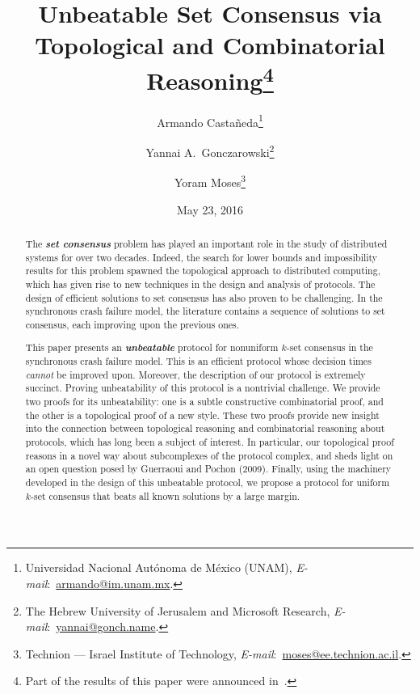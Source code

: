 \documentclass[11pt]{article}
\theoremstyle{definition}
\newcommand{\defemph}[1]{\textbf{\textit{#1}}}
\begin{document}
\title{Unbeatable Set Consensus via \\ Topological and Combinatorial Reasoning\thanks{
Part of the results of this paper
were announced
in~\cite{AYY-PODC-BA}.
}}

\author{Armando Casta\~{n}eda\thanks{Universidad Nacional Aut\'onoma de M\'exico (UNAM), \mbox{\emph{E-mail}: \href{mailto:armando@im.unam.mx}{armando@im.unam.mx}}.}
\and Yannai A.~Gonczarowski\thanks{The Hebrew University of Jerusalem and Microsoft Research, \mbox{\emph{E-mail}: \href{mailto:yannai@gonch.name}{yannai@gonch.name}}.}
\and Yoram Moses\thanks{Technion --- Israel Institute of Technology, \mbox{\emph{E-mail}: \href{mailto:moses@ee.technion.ac.il}{moses@ee.technion.ac.il}}.}}

\date{May 23, 2016}

\maketitle
\begin{abstract}
The \defemph{set consensus} problem has played an important role in the study of distributed systems for over two decades. Indeed, the search for lower bounds and impossibility results for this problem  spawned the topological approach to distributed computing, which has given rise to new techniques in the design and analysis of protocols. The design of efficient solutions to set consensus has also proven to be challenging.
In the synchronous crash failure model, the literature contains a sequence of solutions to set consensus, each improving upon the previous ones.

This paper presents an \defemph{unbeatable} protocol for nonuniform $k$-set consensus in the synchronous crash failure model.
This is an efficient protocol whose decision times \emph{cannot} be improved upon.
Moreover, the description of our protocol is extremely succinct.
Proving unbeatability of this protocol is a nontrivial challenge.
We provide two proofs for its unbeatability: one is a subtle constructive combinatorial proof, and the other is a topological proof of a new style.
These two proofs provide new insight into the connection between  topological reasoning and combinatorial reasoning about protocols, which has long been a subject of interest. In particular, our topological proof  reasons in a novel way about subcomplexes of the protocol complex, and sheds light on an open question posed by Guerraoui and Pochon (2009).
Finally, using the machinery developed in the design of this unbeatable protocol, we propose a protocol for uniform $k$-set consensus that beats all known solutions by a large margin.

\end{abstract}
\end{document}
